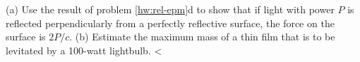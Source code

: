 (a) Use the result of problem \ref{hw:rel-epm}d to show that if light
with power $P$ is reflected perpendicularly from a perfectly
reflective surface, the force on the surface is $2P/c$.\hwendpart
(b) Estimate the maximum mass of a thin film that is to be
levitated by a 100-watt lightbulb.
<%

